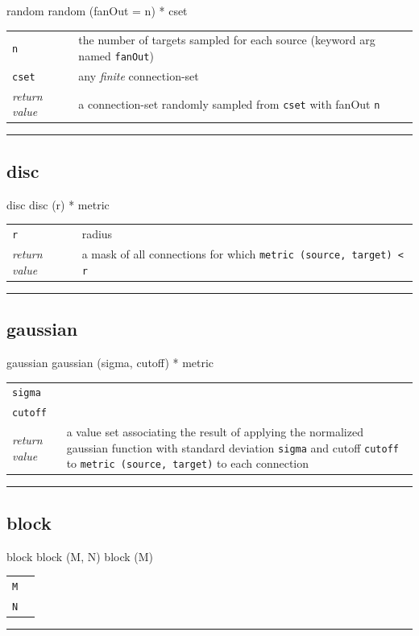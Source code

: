 \documentclass[a4paper,twoside]{report}
\makeatletter
\newenvironment{parameters}%
{\begin{tabular}{@{\hspace{2em}}lp{0.6\textwidth}}}%
{\end{tabular}\par\vspace{1mm}\par\hrule\par\vspace{5mm}}
\newcommand{\fa}[1]{\lstinline|#1|}
\newcommand{\expr}[1]{\lstinline|#1|}
\newcommand{\ret}{\emph{return value}}
\makeatother
\begin{document}
\begin{head}{random}
  random (fanOut = n) * cset
\end{head}
\begin{parameters}
  \lstinline|n| &%
  the number of targets sampled for each source (keyword arg named \fa{fanOut})\\
  \fa{cset} &%
  any \emph{finite} connection-set\\
  \ret &%
  a connection-set randomly sampled from \fa{cset} with fanOut \fa{n}\\
\end{parameters}

\subsection{disc}

\begin{head}{disc}
  disc (r) * metric
\end{head}
\begin{parameters}
  \fa{r} & radius \\
  \ret & a mask of all connections for which
  \expr{metric (source, target) < r} \\
\end{parameters}

\subsection{gaussian}

\begin{head}{gaussian}
  gaussian (sigma, cutoff) * metric
\end{head}
\begin{parameters}
  \lstinline|sigma| &%
  \\
  \lstinline|cutoff| &%
  \\
  \ret & a value set associating the result of applying the normalized
  gaussian function with standard deviation \fa{sigma} and cutoff
  \fa{cutoff} to \expr{metric (source, target)} to each connection\\
\end{parameters}

\subsection{block}

\begin{head}{block}
  block (M, N)
  block (M)
\end{head}
\begin{parameters}
  \fa{M} & \\
  \fa{N} & \\
\end{parameters}
\end{document}

